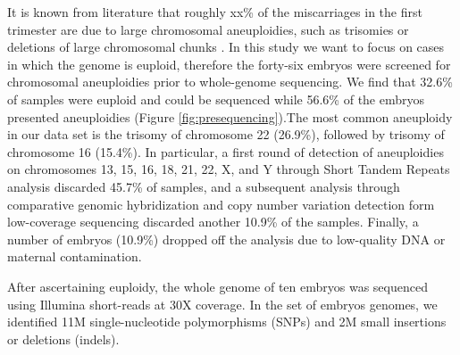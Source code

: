 \documentclass[fleqn,10pt]{wlscirep}
\begin{document}
It is known from literature that roughly xx\% of the miscarriages in the first trimester are due to large chromosomal aneuploidies, such as trisomies or deletions of large chromosomal chunks \cite{goddijn2000genetic,zhang2009genetic}. In this study we want to focus on cases in which the genome is euploid, therefore the forty-six embryos were screened for chromosomal aneuploidies prior to whole-genome sequencing. We find that 32.6\% of samples were euploid and could be sequenced while 56.6\% of the embryos presented aneuploidies (Figure \ref{fig:presequencing}).The most common aneuploidy in our data set is the trisomy of chromosome 22 (26.9\%), followed by trisomy of chromosome 16 (15.4\%). In particular, a first round of detection of aneuploidies on chromosomes 13, 15, 16, 18, 21, 22, X, and Y through Short Tandem Repeats analysis discarded 45.7\% of samples, %
and a subsequent analysis through comparative genomic hybridization and copy number variation detection form low-coverage sequencing discarded another 10.9\% of the samples. Finally, a number of embryos (10.9\%) dropped off the analysis due to low-quality DNA or maternal contamination. 

After ascertaining euploidy, %
the whole genome of ten embryos was sequenced using Illumina short-reads at 30X coverage. In the set of embryos genomes, we identified 11M single-nucleotide polymorphisms (SNPs) and 2M small insertions or deletions (indels).%


\end{document}
